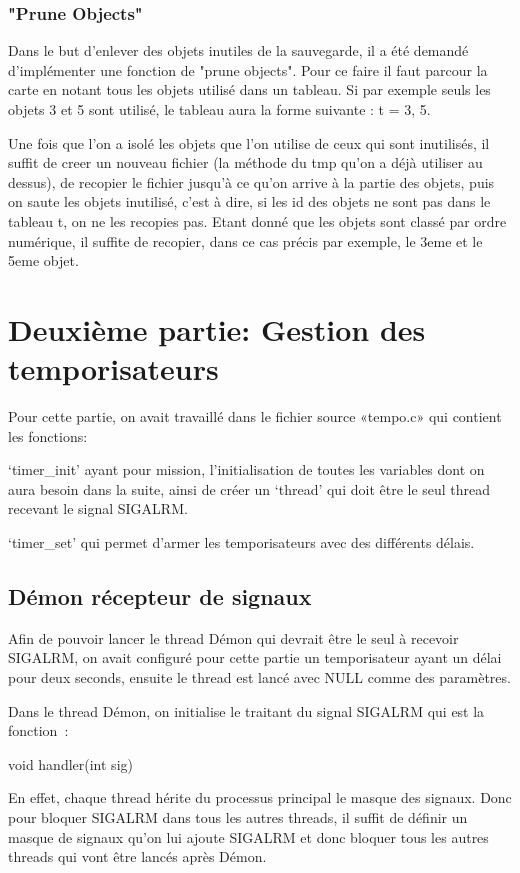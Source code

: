 \documentclass{article}
\begin{document}
\subsubsection{"Prune Objects"}
Dans le but d'enlever des objets inutiles de la sauvegarde, il a été demandé d'implémenter une fonction de "prune objects". Pour ce faire il faut parcour la carte en notant tous les objets utilisé dans un tableau. Si par exemple seuls les objets 3 et 5 sont utilisé, le tableau aura la forme suivante : t = {3, 5}.

Une fois que l'on a isolé les objets que l'on utilise de ceux qui sont inutilisés, il suffit de creer un nouveau fichier (la méthode du tmp qu'on a déjà utiliser au dessus), de recopier le fichier jusqu'à ce qu'on arrive à la partie des objets, puis on saute les objets inutilisé, c'est à dire, si les id des objets ne sont pas dans le tableau t, on ne les recopies pas. Etant donné que les objets sont classé par ordre numérique, il suffite de recopier, dans ce cas précis par exemple, le 3eme et le 5eme objet.


\newpage
\section{Deuxième partie: Gestion des temporisateurs}

Pour cette partie, on avait travaillé dans le fichier source «tempo.c» qui contient les fonctions: 

‘timer_init’ ayant pour mission, l’initialisation de toutes les variables dont on aura besoin dans la suite, ainsi de créer un ‘thread’ qui doit être le seul thread recevant le signal SIGALRM. 

‘timer_set’ qui permet d’armer les temporisateurs avec des différents délais.
\subsection{Démon récepteur de signaux}

Afin de pouvoir lancer le thread Démon qui devrait être le seul à recevoir SIGALRM, on avait configuré pour cette partie un temporisateur ayant un délai pour deux seconds, ensuite le thread est lancé avec NULL comme des paramètres.

Dans le thread Démon, on initialise le traitant du signal SIGALRM qui est la fonction :

void handler(int sig)

En effet, chaque thread hérite du processus principal le masque des signaux. Donc pour bloquer SIGALRM dans tous les autres threads, il suffit de définir un masque de signaux qu’on lui ajoute SIGALRM et donc bloquer tous les autres threads qui vont être lancés après Démon.
\end{document}
